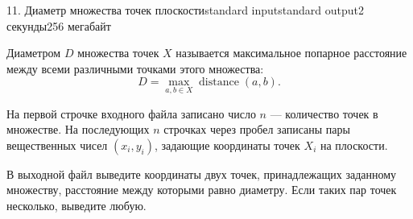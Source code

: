 \begin{problem}{11. Диаметр множества точек плоскости}{standard input}{standard output}{2 секунды}{256 мегабайт}

Диаметром $D$ множества точек $X$ называется максимальное попарное расстояние между всеми различными точками этого множества:
$$ D = \max\limits_{a, b \in X} \operatorname{distance}(a, b). $$

\InputFile

На первой строчке входного файла записано число $n$ — количество точек в множестве. На последующих $n$ строчках через пробел записаны пары вещественных чисел $(x_i, y_i)$, задающие координаты точек $X_i$ на плоскости.

\OutputFile
В выходной файл выведите координаты двух точек, принадлежащих заданному множеству, расстояние между которыми равно диаметру. Если таких пар точек несколько, выведите любую.

\Examples

\begin{example}%
%
%
\end{example}

\end{problem}
